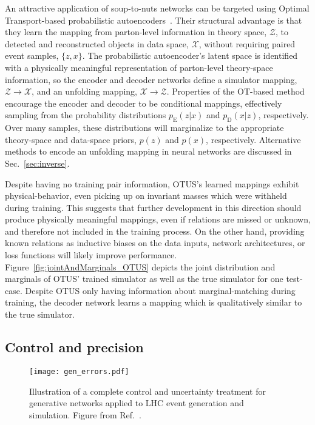 \documentclass[submission,Phys]{SciPost}
\begin{document}
An attractive application of soup-to-nuts networks can be targeted using Optimal Transport-based probabilistic autoencoders~\cite{Howard:2021pos}. Their structural advantage is that they learn the mapping from parton-level information in theory space, $\mathcal{Z}$, to detected and reconstructed objects in data space, $\mathcal{X}$, without requiring paired event samples, $\{z, x\}$. The probabilistic autoencoder's latent space is identified with a physically meaningful representation of parton-level theory-space information, so the encoder and decoder networks define a simulator mapping, $\mathcal{Z} \rightarrow \mathcal{X}$, and an unfolding mapping, $\mathcal{X} \rightarrow \mathcal{Z}$. Properties of the OT-based method encourage the encoder and decoder to be conditional mappings, effectively sampling from the probability distributions $p_\text{E}(z|x)$ and $p_\text{D}(x|z)$, respectively. Over many samples, these distributions will marginalize to the appropriate theory-space and data-space priors, $p(z)$ and $p(x)$, respectively. Alternative methods to encode an unfolding mapping in neural networks are discussed in Sec.~\ref{sec:inverse}.

Despite having no training pair information, OTUS's learned mappings exhibit physical-behavior, even picking up on invariant masses which were withheld during training. This suggests that further development in this direction should produce physically meaningful mappings, even if relations are missed or unknown, and therefore not included in the training process.  On the other hand, providing known relations as inductive biases on the data inputs, network architectures, or loss functions will likely improve performance. Figure~\ref{fig:jointAndMarginals_OTUS} depicts the joint distribution and marginals of OTUS' trained simulator as well as the true simulator for one test-case. Despite OTUS only having information about marginal-matching during training, the decoder network learns a mapping which is qualitatively similar to the true simulator.

\subsection{Control and precision}
\label{sec:onestage_precision}

\begin{figure}[t]
\centering
  \texttt{[image: gen\_errors.pdf]}
  \caption{Illustration of a complete control and uncertainty treatment for generative networks applied to LHC event generation and simulation. Figure from Ref.~\cite{Butter:2021csz}.}
  \label{fig:3_gen_errors}
\end{figure}
\end{document}
